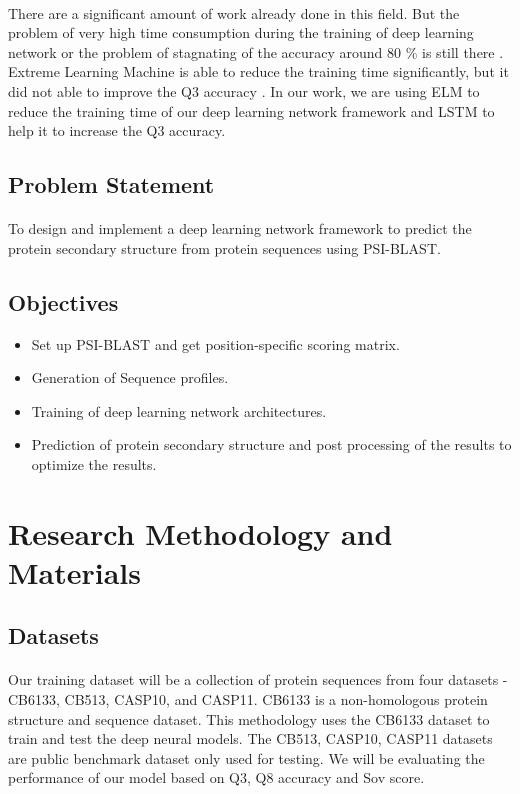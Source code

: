 \documentclass[12pt]{article}
\numberwithin{figure}{section}
\begin{document}
\paragraph{}
There are a significant amount of work already done in this field. But the problem of very high time consumption during the training of deep learning network \cite{3} or the problem of stagnating of the accuracy around 80 \% is still there \cite{6}. Extreme Learning Machine is able to reduce the training time significantly, but it did not able to improve the Q3 accuracy \cite{4}. In our work, we are using ELM to reduce the training time of our deep learning network framework and LSTM to help it to increase the Q3 accuracy.
 \subsection{Problem Statement}
 \paragraph{}
 To design and implement a deep learning network framework to predict the protein secondary structure from protein sequences using PSI-BLAST.
\subsection{Objectives}
\begin{itemize}
\item Set up PSI-BLAST and get position-specific scoring matrix.
\item Generation of Sequence profiles.
\item Training of deep learning network architectures.
\item Prediction of protein secondary structure and post processing of the results to optimize the results.
\end{itemize}
\clearpage
\section{Research Methodology and Materials}
\subsection{Datasets}
\paragraph{}
Our training dataset will be a collection of protein sequences from four datasets - CB6133, CB513, CASP10, and CASP11. CB6133 is a non-homologous protein structure and sequence dataset. This methodology uses the CB6133 dataset to train and test the deep neural models. The CB513, CASP10, CASP11 datasets are public benchmark dataset only used for testing. We will be evaluating the performance of our model based on Q3, Q8 accuracy and Sov score.
\end{document}
